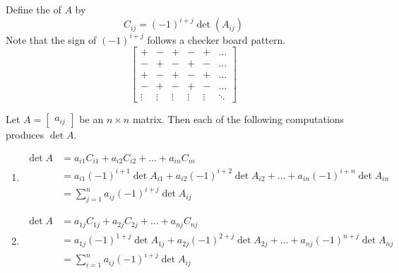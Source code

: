 \documentclass{ximera}
\begin{document}
 Define the  of $A$ by
 $$C_{ij}=(-1)^{i+j}\det(A_{ij})$$
 Note that the sign of $(-1)^{i+j}$ follows a checker board pattern.
 $$\begin{bmatrix}+&-&+&-&+&\ldots\\-&+&-&+&-&\ldots\\
 +&-&+&-&+&\ldots\\-&+&-&+&-&\ldots\\\vdots &\vdots  & \vdots & \vdots &\vdots &\ddots \end{bmatrix}$$

\begin{theorem}\label{th:laplace1}
Let $A=\begin{bmatrix}a_{ij}\end{bmatrix}$ be an $n\times n$ matrix.  Then each of the following computations produces $\det{A}$.
\begin{enumerate}
    \item \label{eq:laplace1a} 
\begin{align*}
\det{A}&=a_{i1}C_{i1}+a_{i2}C_{i2}+\ldots +a_{in}C_{in}\\
&=a_{i1}(-1)^{i+1}\det{A_{i1}}+a_{i2}(-1)^{i+2}\det{A_{i2}}+\ldots +a_{in}(-1)^{i+n}\det{A_{in}}\\
&=\sum_{j=1}^na_{ij}(-1)^{i+j}\det{A_{ij}}
\end{align*}
\item \label{eq:laplace1b} 
\begin{align*}
\det{A}&=a_{1j}C_{1j}+a_{2j}C_{2j}+\ldots +a_{nj}C_{nj}\\
&=a_{1j}(-1)^{1+j}\det{A_{1j}}+a_{2j}(-1)^{2+j}\det{A_{2j}}+\ldots +a_{nj}(-1)^{n+j}\det{A_{nj}}\\
&=\sum_{i=1}^na_{ij}(-1)^{i+j}\det{A_{ij}}
\end{align*}
\end{enumerate}
\end{theorem}
 
 
\end{document}
